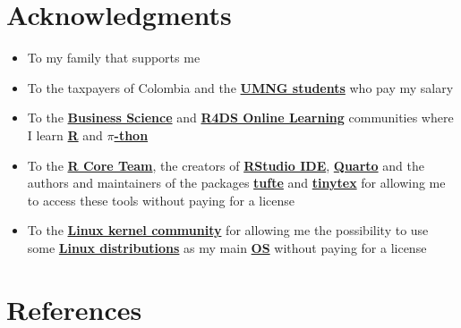 \documentclass[
  ignorenonframetext,
]{beamer}
\begin{document}
\section{Acknowledgments}\label{acknowledgments}

\begin{frame}{}
\label{section-11}
\begin{itemize}
\item
  To my family that supports me
\item
  To the taxpayers of Colombia and the
  \href{https://www.umng.edu.co/estudiante}{\textbf{UMNG students}} who
  pay my salary
\item
  To the \href{https://www.business-science.io/}{\textbf{Business
  Science}} and \href{https://www.rfordatasci.com/}{\textbf{R4DS Online
  Learning}} communities where I learn
  \href{https://www.r-project.org/about.html}{\textbf{R}} and
  \href{https://www.python.org/about/}{\textbf{\(\pi\)-thon}}
\item
  To the \href{https://www.r-project.org/contributors.html}{\textbf{R
  Core Team}}, the creators of
  \href{https://rstudio.com/products/rstudio/}{\textbf{RStudio IDE}},
  \href{https://quarto.org/}{\textbf{Quarto}} and the authors and
  maintainers of the packages
  \href{https://CRAN.R-project.org/package=tufte}{\textbf{tufte}} and
  \href{https://CRAN.R-project.org/package=tinytex}{\textbf{tinytex}}
  for allowing me to access these tools without paying for a license
\item
  To the \href{https://www.kernel.org/category/about.html}{\textbf{Linux
  kernel community}} for allowing me the possibility to use some
  \href{https://static.lwn.net/Distributions/}{\textbf{Linux
  distributions}} as my main
  \href{https://en.wikipedia.org/wiki/Operating_system}{\textbf{OS}}
  without paying for a license
\end{itemize}
\end{frame}

\section*{References}\label{references}
\end{document}
